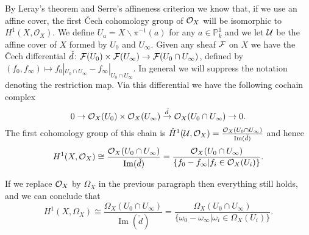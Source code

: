\documentclass[11pt]{article} %
\theoremstyle{plain}
\theoremstyle{remark}
\newcommand{\cO}{{\cal O}}
\newcommand{\cech}{\v{C}ech }
\newcommand{\hone}{H^1(X,\mathcal{O}_X)}
\newcommand{\cechhone}{\check{H}^1(\mathcal U,\mathcal O_X)}
\DeclareMathOperator{\Ima}{Im}
\begin{document}
By Leray's theorem \cite[Thm 5.2.12]{liu} and Serre's affineness criterion \cite[Thm 5.2.23]{liu} we know that, if we use an affine cover, the first \cech cohomology group of $\cO_X$ will be isomorphic to $\hone$.
We define $U_a = X \backslash \pi^{-1}(a)$ for any $a \in \mathbb P_k^1$ and we let ${\cal U}$ be the affine cover of $X$ formed by $U_0$ and $U_\infty$.
Given any sheaf $\cal F$ on $X$ we have the \cech differential $\check{d}\colon {\cal F}(U_0) \times {\cal F} (U_\infty) \rightarrow {\cal F}(U_0 \cap U_\infty)$, defined by $(f_0,f_\infty) \mapsto f_0|_{U_0 \cap U_\infty} - f_\infty|_{U_0 \cap U_\infty}$.
In general we will suppress the notation denoting the restriction map.
Via this differential we have the following cochain complex
\begin{equation*}
0 \rightarrow \cO_X(U_0)\times \cO_X(U_\infty) \xrightarrow{\check{d}} \cO_X(U_0 \cap U_\infty) \rightarrow 0.
\end{equation*}
The first cohomology group of this chain is $\cechhone = \frac{\cO_X(U_0 \cap U_\infty)}{\Ima(\check{d})}$ and hence
\begin{equation}\label{cechhone}
\hone \cong \frac{\cO_X(U_0 \cap U_\infty)}{\Ima(\check{d})}  
 = \frac{\cO_X(U_0 \cap U_\infty)}{\{f_0 - f_\infty | f_i \in \cO_X(U_i) \}}.
\end{equation}

If we replace $\cO_X$ by $\Omega_X$ in the previous paragraph then everything still holds, and we can conclude that
\[
H^1(X,\Omega_X) \cong \frac{\Omega_X(U_0 \cap U_\infty)}{\Ima(\check{d})} = \frac{\Omega_X(U_0 \cap U_\infty)}{\{\omega_0 - \omega_ \infty | \omega_i \in \Omega_X(U_i)\}}.
\]
\end{document}
